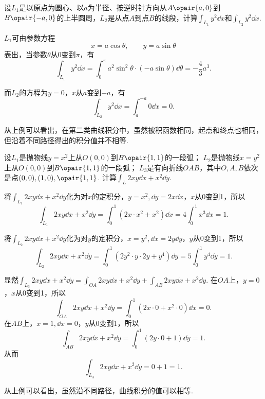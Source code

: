 \begin{example}
设\(L_1\)是以原点为圆心、以\(a\)为半径、按逆时针方向从\(A\opair{a,0}\)到\(B\opair{-a,0}\)的上半圆周，\(L_2\)是从点\(A\)到点\(B\)的线段，计算\(\int_{L_1} y^2 \dd{x}\)和\(\int_{L_2} y^2 \dd{x}\).
\begin{solution}
\(L_1\)可由参数方程\[
x = a \cos\theta, \qquad y = a \sin\theta
\]表出，当参数\(\theta\)从\(0\)变到\(\pi\)，有\[
\int_{L_1} y^2 \dd{x}
= \int_0^\pi a^2 \sin^2 \theta \cdot (-a \sin\theta) \dd{\theta}
= -\frac{4}{3} a^3.
\]

而\(L_2\)的方程为\(y=0\)，\(x\)从\(a\)变到\(-a\)，有\[
\int_{L_2} y^2 \dd{x} = \int_a^{-a} 0 \dd{x} = 0.
\]
\end{solution}
\end{example}
从上例可以看出，在第二类曲线积分中，虽然被积函数相同，起点和终点也相同，但沿着不同路径得出的积分值并不相等.

\begin{example}
设\(L_1\)是抛物线\(y=x^2\)上从\(O(0,0)\)到\(B\opair{1,1}\)的一段弧；
\(L_2\)是抛物线\(x=y^2\)上从\(O(0,0)\)到\(B\opair{1,1}\)的一段弧；
\(L_3\)是有向折线\(OAB\)，其中\(O,A,B\)依次是点\((0,0),(1,0),\opair{1,1}\).
计算\(\int_L 2xy\dd{x}+x^2\dd{y}\).
\begin{solution}
将\(\int_{L_1} 2xy\dd{x}+x^2\dd{y}\)化为对\(x\)的定积分，\(y=x^2, \dd{y}=2x\dd{x}\)，\(x\)从0变到1，所以\[
\int_{L_1} 2xy\dd{x}+x^2\dd{y}
= \int_0^1 (2x \cdot x^2 + x^2) \dd{x}
= 4 \int_0^1 x^3 \dd{x} = 1.
\]

将\(\int_{L_2} 2xy\dd{x}+x^2\dd{y}\)化为对\(y\)的定积分，\(x=y^2, \dd{x}=2y\dd{y}\)，\(y\)从0变到1，所以\[
\int_{L_2} 2xy\dd{x}+x^2\dd{y}
= \int_0^1 (2y^2 \cdot y \cdot 2y + y^4) \dd{y}
= 5 \int_0^1 y^4 \dd{y} = 1.
\]

显然\(\int_{L_3} 2xy\dd{x}+x^2\dd{y} = \int_{OA} 2xy\dd{x}+x^2\dd{y} + \int_{AB} 2xy\dd{x}+x^2\dd{y}\).
在\(OA\)上，\(y=0\)，\(x\)从0变到1，所以\[
\int_{OA} 2xy\dd{x}+x^2\dd{y}
= \int_0^1 (2x\cdot0+x^2\cdot0) \dd{x} = 0.
\]
在\(AB\)上，\(x=1, \dd{x}=0\)，\(y\)从0变到1，所以\[
\int_{AB} 2xy\dd{x}+x^2\dd{y}
= \int_0^1 (2y\cdot0+1) \dd{y} = 1.
\]从而\[
\int_{L_3} 2xy\dd{x}+x^2\dd{y} = 0 + 1 = 1.
\]
\end{solution}
\end{example}
从上例可以看出，虽然沿不同路径，曲线积分的值可以相等.

